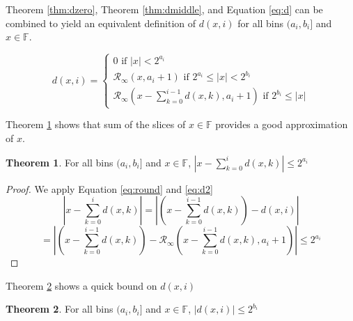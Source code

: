 \documentclass[12pt]{article}
\providecommand{\F}{\ensuremath{\mathbb{F}}}
\providecommand{\roundtonearestinfty}{\ensuremath{\mathcal{R}_\text{$\infty$}}}
\theoremstyle{definition}
\newtheorem{thm}{Theorem}[section]
\numberwithin{equation}{section}
\begin{document}
    Theorem \ref{thm:dzero}, Theorem \ref{thm:dmiddle}, and Equation \ref{eq:d} can be combined to yield an equivalent definition of $d(x, i)$ for all bins $(a_i, b_i]$ and $x \in \F$.

    \begin{equation}
      d(x, i) = \begin{cases}0 \text{ if } |x| < 2^{a_i}\\ \roundtonearestinfty(x, a_i + 1) \text{ if } 2^{a_i} \leq |x| < 2^{b_i}\\\roundtonearestinfty(x - \sum\limits_{k=0}^{i - 1}d(x,k), a_i + 1) \text{ if } 2^{b_i} \leq |x| \end{cases}
      \label{eq:d2}
    \end{equation}

    Theorem \ref{thm:dround} shows that sum of the slices of $x \in \F$ provides a good approximation of $x$.

    \begin{thm}
      For all bins $(a_i, b_i]$ and $x \in \F$, $|x - \sum \limits_{k = 0}^id(x, k)| \leq 2^{a_i}$
      \label{thm:dround}
    \end{thm}

    \begin{proof}
      We apply Equation \ref{eq:round} and \ref{eq:d2}
      \begin{equation*}
        |x - \sum \limits_{k = 0}^{i}d(x, k)| = |(x - \sum \limits_{k = 0}^{i - 1}d(x, k)) - d(x, i)|
      \end{equation*}
      \begin{equation*}
         = |(x - \sum \limits_{k = 0}^{i - 1}d(x, k)) - \roundtonearestinfty(x - \sum \limits_{k = 0}^{i - 1}d(x, k), a_{i} + 1)| \leq 2^{a_{i}}
      \end{equation*}
    \end{proof}

    Theorem \ref{thm:dbound} shows a quick bound on $d(x, i)$

    \begin{thm}
      For all bins $(a_i, b_i]$ and $x \in \F$, $|d(x, i)| \leq 2^{b_i}$
      \label{thm:dbound}
    \end{thm}
\end{document}

